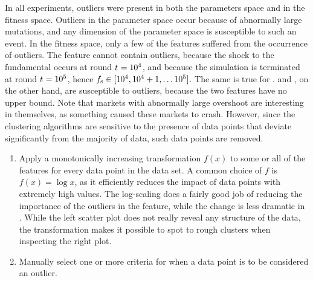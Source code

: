 In all experiments, outliers were present in both the parameters space and in the fitness space. Outliers in the parameter space occur because of abnormally large mutations, and any dimension of the parameter space is susceptible to such an event. In the fitness space, only a few of the features suffered from the occurrence of outliers. The feature \roundstable cannot contain outliers, because the shock to the fundamental occurs at round $t_{} = 10^4$, and because the simulation is terminated at round $t_{} = 10^5$, hence $f_\text{s} \in [10^4,10^4+1,\hdots 10^5]$. The same is true for \timetoreachnewfundamental. \stdev and \overshoot, on the other hand, are susceptible to outliers, because the two features have no upper bound. Note that markets with abnormally large overshoot are interesting in themselves, as something caused these markets to crash. However, since the clustering algorithms are sensitive to the presence of data points that deviate significantly from the majority of data, such data points are removed. 

\begin{enumerate}
\item Apply a monotonically increasing transformation $f(x)$ to some or all of the features for every data point in the data set. A common choice of $f$ is $f(x) = \log x$, as it efficiently reduces the impact of data points with extremely high values. The log-scaling does a fairly good job of reducing the importance of the outliers in the \stdev feature, while the change is less dramatic in \timetoreachnewfundamental. While the left scatter plot does not really reveal any structure of the data, the transformation makes it possible to spot to rough clusters when inspecting the right plot.
\item Manually select one or more criteria for when a data point is to be considered an outlier. 
\end{enumerate}




